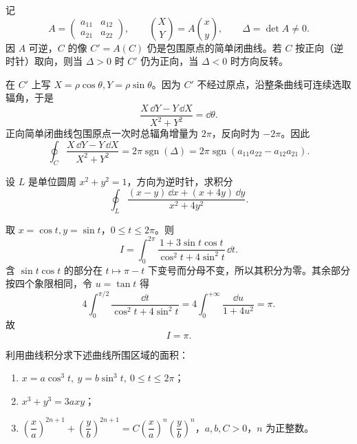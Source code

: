 \begin{xsolution}
记
\[
  A=\begin{pmatrix}a_{11}&a_{12}\\a_{21}&a_{22}\end{pmatrix},
  \qquad
  \binom XY=A\binom xy,
  \qquad \Delta=\det A\ne0.
\]
因 $A$ 可逆，$C$ 的像 $C'=A(C)$ 仍是包围原点的简单闭曲线。若 $C$ 按正向（逆时针）取向，则当 $\Delta>0$ 时 $C'$ 仍为正向，当 $\Delta<0$ 时方向反转。

在 $C'$ 上写 $X=\rho\cos\theta,Y=\rho\sin\theta$。因为 $C'$ 不经过原点，沿整条曲线可连续选取辐角，于是
\[
  \frac{X\,\dd Y-Y\,\dd X}{X^2+Y^2}=\dd\theta.
\]
正向简单闭曲线包围原点一次时总辐角增量为 $2\pi$，反向时为 $-2\pi$。因此
\[
  \oint_C\frac{X\,\dd Y-Y\,\dd X}{X^2+Y^2}
  =2\pi\operatorname{sgn}(\Delta)
  =2\pi\operatorname{sgn}(a_{11}a_{22}-a_{12}a_{21}).
\]
\end{xsolution}
\begin{xexercise}[6]
设 $L$ 是单位圆周 $x^2+y^2=1$，方向为逆时针，求积分
\[
  \oint_L\frac{(x-y)\,\dd x+(x+4y)\,\dd y}{x^2+4y^2}.
\]
\end{xexercise}
\begin{xsolution}
取 $x=\cos t,y=\sin t$，$0\le t\le2\pi$。则
\[
  I=\int_0^{2\pi}
  \frac{1+3\sin t\cos t}{\cos^2t+4\sin^2t}\,\dd t.
\]
含 $\sin t\cos t$ 的部分在 $t\mapsto\pi-t$ 下变号而分母不变，所以其积分为零。其余部分按四个象限相同，令 $u=\tan t$ 得
\[
  4\int_0^{\pi/2}\frac{\dd t}{\cos^2t+4\sin^2t}
  =4\int_0^{+\infty}\frac{\dd u}{1+4u^2}
  =\pi.
\]
故
\[
  I=\pi.
\]
\end{xsolution}
\begin{xexercise}[7]
利用曲线积分求下述曲线所围区域的面积：
\begin{enumerate}[label=(\arabic*)]
  \item $x=a\cos^3t,\ y=b\sin^3t,\ 0\le t\le2\pi$；
  \item $x^3+y^3=3axy$；
  \item $\left(\dfrac xa\right)^{2n+1}+\left(\dfrac yb\right)^{2n+1}=C\left(\dfrac xa\right)^n\left(\dfrac yb\right)^n$，$a,b,C>0$，$n$ 为正整数。
\end{enumerate}
\end{xexercise}

